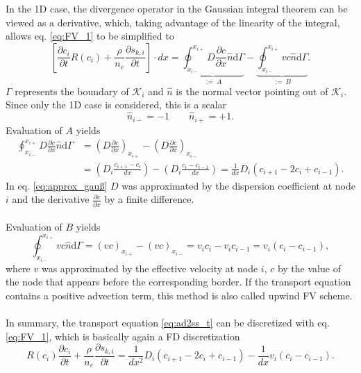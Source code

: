 In the 1D case, the divergence operator in the Gaussian integral theorem can be viewed as a derivative, which, taking advantage of the linearity of the integral, allows eq. \ref{eq:FV_1} to be simplified to
\begin{equation}
    \left[\frac{\partial c_i}{\partial t} R(c_i)  + \frac{\rho}{n_e} \frac{\partial s_{k,i}}{\partial t} \right] \cdot dx = \underbrace{\oint_{x_{i-}}^{x_{i+}} D \frac{\partial c}{\partial x}\hat{n}\mathrm{d}\Gamma}_{:=\: A} - \underbrace{\oint_{x_{i-}}^{x_{i+}} vc\hat{n} \mathrm{d}\Gamma}_{:=\: B}.
\end{equation}
$\Gamma$ represents the boundary of $\mathcal{K}_i$ and $\hat{n}$ is the normal vector pointing out of $\mathcal{K}_i$. Since only the 1D case is considered, this is a scalar
\begin{equation}
    \hat{n}_{i-} = -1 \qquad \hat{n}_{i+} = +1.
\end{equation}
Evaluation of $A$ yields
\begin{align}
    \oint_{x_{i-}}^{x_{i+}} D \frac{\partial c}{\partial x}\hat{n}\mathrm{d}\Gamma &= \left(D \frac{\partial c}{\partial x}\right)_{x_{i+}} - \left(D \frac{\partial c}{\partial x}\right)_{x_{i-}} \nonumber\\
    &= \left(D_i \frac{c_{i+1}-c_i}{dx}\right) - \left(D_i\frac{c_i-c_{i-1}}{dx}\right) = \frac{1}{dx}D_i(c_{i+1}-2c_i+c_{i-1}).
    \label{eq:approx_gauß}
\end{align}
In eq. \ref{eq:approx_gauß} $D$ was approximated by the dispersion coefficient at node $i$ and the derivative $\frac{\partial c}{\partial x}$ by a finite difference.\\
\\
Evaluation of $B$ yields
\begin{equation}
    \oint_{x_{i-}}^{x_{i+}} vc\hat{n} \mathrm{d}\Gamma = (vc)_{x_{i+}} - (vc)_{x_{i-}} = v_ic_i - v_ic_{i-1} = v_i (c_i - c_{i-1}),
\end{equation}
where $v$ was approximated by the effective velocity at node $i$, $c$ by the value of the node that appears before the corresponding border. If the transport equation contains a positive advection term, this method is also called upwind FV scheme.\\
\\
In summary, the transport equation \ref{eq:ad2ss_t} can be discretized with eq. \ref{eq:FV_1}, which is basically again a FD discretization
\begin{equation}
    R(c_i)\frac{\partial c_i}{\partial t}  + \frac{\rho}{n_e} \frac{\partial s_{k,i}}{\partial t}= \frac{1}{dx^2}D_i(c_{i+1}-2c_i+c_{i-1}) - \frac{1}{dx}v_i (c_i - c_{i-1}).
    \label{eq:FV_10}
\end{equation}
